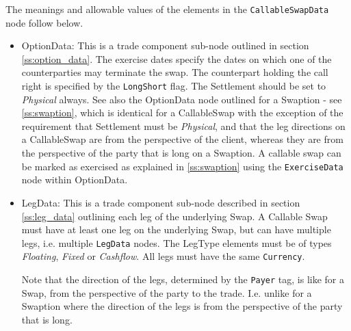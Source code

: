 The meanings and allowable values of the elements in the \lstinline!CallableSwapData!  node follow below.

\begin{itemize}

\item OptionData: This is a trade component sub-node outlined in section \ref{ss:option_data}. The exercise dates
  specify the dates on which one of the counterparties may terminate the swap. The counterpart holding the call right is
  specified by the {\tt LongShort} flag. The Settlement should be set to \emph{Physical} always. See also the OptionData
  node outlined for a Swaption - see \ref{ss:swaption}, which is identical for a CallableSwap with the exception of the
  requirement that Settlement must be \emph{Physical}, and that the leg directions on a CallableSwap are from the perspective of the client, whereas they are from the perspective of the party that is long on a Swaption. A callable swap can be marked as exercised as explained in
  \ref{ss:swaption} using the \lstinline!ExerciseData! node within OptionData.

\item LegData: This is a trade component sub-node described in section \ref{ss:leg_data} outlining each leg of the
  underlying Swap. A Callable Swap must have at least one leg on the underlying Swap, but can have multiple legs,
  i.e. multiple \lstinline!LegData! nodes.  The LegType elements must be of types \emph{Floating}, \emph{Fixed} or
  \emph{Cashflow}. All legs must have the same \lstinline!Currency!.
  
  Note that the direction of the legs, determined by the \lstinline!Payer! tag, is like for a Swap, from the perspective of the party to the trade. I.e. unlike for a Swaption where the direction of the legs is from the perspective of the party that is long. 

\end{itemize}
